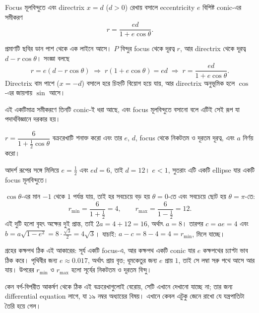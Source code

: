 \documentclass[11pt]{article}
\begin{document}
\begin{idea}
Focus মূলবিন্দুতে এবং directrix $x = d$ ($d > 0$) রেখায় বসালে eccentricity $e$
বিশিষ্ট conic-এর সমীকরণ
\[
  r = \frac{ed}{1 + e\cos\theta} .
\]
\end{idea}

প্রমাণটি ছবির ডান পাশ থেকে এক লাইনে আসে। $P$ বিন্দুর focus থেকে দূরত্ব $r$, আর
directrix থেকে দূরত্ব $d - r\cos\theta$। সংজ্ঞা বলছে
\[
  r = e\left( d - r\cos\theta \right)
  \;\Longrightarrow\; r\left( 1 + e\cos\theta \right) = ed
  \;\Longrightarrow\; r = \frac{ed}{1+e\cos\theta} .
\]
Directrix বাম পাশে ($x = -d$) বসালে হরে চিহ্নটি বিয়োগ হয়ে যায়, আর directrix
অনুভূমিক হলে $\cos$-এর জায়গায় $\sin$ আসে।

এই একটিমাত্র সমীকরণে তিনটি conic-ই ধরা আছে, এবং focus মূলবিন্দুতে বসানো বলে
এটিই সেই রূপ যা পদার্থবিজ্ঞানে দরকার হয়।

\begin{example}
$r = \dfrac{6}{1 + \tfrac{1}{2}\cos\theta}$ বক্ররেখাটি শনাক্ত করো এবং তার
$e$, $d$, focus থেকে নিকটতম ও দূরতম দূরত্ব, এবং $a$ নির্ণয় করো।
\end{example}

\begin{solbox}
আদর্শ রূপের সঙ্গে মিলিয়ে $e = \tfrac{1}{2}$ এবং $ed = 6$, তাই $d = 12$।
$e < 1$, সুতরাং এটি একটি ellipse যার একটি focus মূলবিন্দুতে।

$\cos\theta$-এর মান $-1$ থেকে $1$ পর্যন্ত যায়, তাই হর সবচেয়ে বড় হয়
$\theta = 0$-তে এবং সবচেয়ে ছোট হয় $\theta = \pi$-তে:
\[
  r_{\min} = \frac{6}{1+\tfrac{1}{2}} = 4, \qquad
  r_{\max} = \frac{6}{1-\tfrac{1}{2}} = 12 .
\]
এই দুটি হলো বৃহৎ অক্ষের দুই প্রান্ত, তাই $2a = 4 + 12 = 16$, অর্থাৎ $a = 8$।
তারপর $c = ae = 4$ এবং $b = a\sqrt{1-e^{2}} = 8 \cdot \tfrac{\sqrt{3}}{2}
= 4\sqrt{3}$। যাচাই: $a - c = 8 - 4 = 4 = r_{\min}$, মিলে যাচ্ছে।
\end{solbox}

\begin{remark}
গ্রহের কক্ষপথ ঠিক এই আকারের: সূর্য একটি focus-এ, আর কক্ষপথ একটি conic যার
$e$ কক্ষপথের চ্যাপ্টা ভাব ঠিক করে। পৃথিবীর জন্য $e \approx 0.017$, অর্থাৎ প্রায়
বৃত্ত; ধূমকেতুর জন্য $e$ প্রায় $1$, তাই সে লম্বা সরু পথে আসে আর যায়। উপরের
$r_{\min}$ ও $r_{\max}$ হলো সূর্যের নিকটতম ও দূরতম বিন্দু।

কেন বর্গ-বিপরীত আকর্ষণ থেকে ঠিক এই বক্ররেখাগুলোই বেরোয়, সেটি এখানে দেখানো
যাচ্ছে না; তার জন্য differential equation লাগে, যা ১৯ নম্বর অধ্যায়ের বিষয়।
এখানে কেবল এটুকু জেনে রাখো যে যন্ত্রপাতিটা তৈরি হয়ে গেল।
\end{remark}
\end{document}
